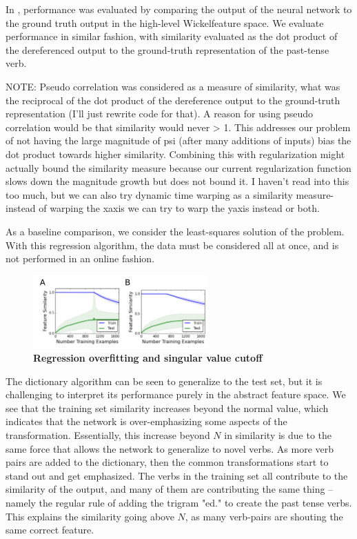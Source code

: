 \documentclass{article}
\begin{document}
In \citet{Rumelhart1986a}, performance was evaluated by comparing the output of the neural network to the ground truth output in the high-level Wickelfeature space. We evaluate performance in similar fashion, with similarity evaluated as the dot product of the dereferenced output to the ground-truth representation of the past-tense verb. 

NOTE: Pseudo correlation was considered as a measure of similarity, what was the reciprocal of the dot product of the dereference output to the ground-truth representation (I'll just rewrite code for that). A reason for using pseudo correlation would be that similarity would never > 1. This addresses our problem of not having the large magnitude of psi (after many additions of inputs) bias the dot product towards higher similarity. Combining this with regularization might actually bound the similarity measure because our current regularization function slows down the magnitude growth but does not bound it.
I haven't read into this too much, but we can also try dynamic time warping as a similarity measure-instead of warping the xaxis we can try to warp the yaxis instead or both.

As a baseline comparison, we consider the least-squares solution of the problem. With this regression algorithm, the data must be considered all at once, and is not performed in an online fashion.

\begin{figure}
\centering
\includegraphics[width=0.6\textwidth]{regression_issue-170518.png}
\caption{\textbf{Regression overfitting and singular value cutoff}}
\end{figure}

The dictionary algorithm can be seen to generalize to the test set, but it is challenging to interpret its performance purely in the abstract feature space. We see that the training set similarity increases beyond the normal value, which indicates that the network is over-emphasizing some aspects of the transformation. Essentially, this increase beyond $N$ in similarity is due to the same force that allows the network to generalize to novel verbs. As more verb pairs are added to the dictionary, then the common transformations start to stand out and get emphasized. The verbs in the training set all contribute to the similarity of the output, and many of them are contributing the same thing -- namely the regular rule of adding the trigram "ed." to create the past tense verbs. This explains the similarity going above $N$, as many verb-pairs are shouting the same correct feature. 
\end{document}
